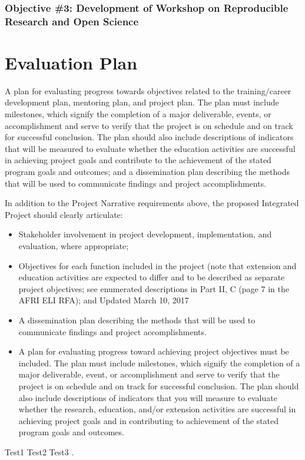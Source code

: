 \documentclass[12pt,letterpaper]{article}
\begin{document}
\subsubsection{Objective \#3: Development of Workshop on Reproducible Research and Open Science}



\section{Evaluation Plan}

A plan for evaluating progress towards objectives related to the
training/career development plan, mentoring plan, and project plan. The plan
must include milestones, which signify the completion of a major deliverable,
events, or accomplishment and serve to verify that the project is on schedule
and on track for successful conclusion. The plan should also include
descriptions of indicators that will be measured to evaluate whether the
education activities are successful in achieving project goals and contribute
to the achievement of the stated program goals and outcomes; and a
dissemination plan describing the methods that will be used to communicate
findings and project accomplishments.

In addition to the Project Narrative requirements above, the proposed
Integrated Project should clearly articulate:

\begin{itemize}

  \item Stakeholder involvement in project development, implementation, and
   evaluation, where appropriate;

  \item Objectives for each function included in the project (note that extension
   and education activities are expected to differ and to be described as
   separate project objectives; see enumerated descriptions in Part II, C
   (page 7 in the AFRI ELI RFA); and Updated March 10, 2017

  \item A dissemination plan describing the methods that will be used to
   communicate findings and project accomplishments.

  \item A plan for evaluating progress toward achieving project objectives must be
   included. The plan must include milestones, which signify the completion of
   a major deliverable, event, or accomplishment and serve to verify that the
   project is on schedule and on track for successful conclusion. The plan
   should also include descriptions of indicators that you will measure to
   evaluate whether the research, education, and/or extension activities are
   successful in achieving project goals and in contributing to achievement of
   the stated program goals and outcomes.

\end{itemize}


Test1 \citep{lehner2017independently} 
Test2 \citep{clarkson2017population}
Test3 \citep{clarkson2017population}.

\newpage
\AtBeginShipout{%
\AtBeginShipoutDiscard
}

\printbibliography
\end{document}
